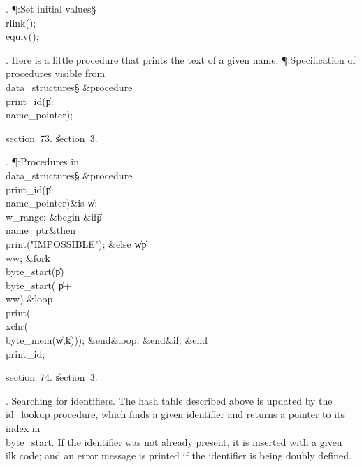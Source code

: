. \P\?:Set initial values\X\mathrel{+}\S\?\6
\\{rlink}\?\1(\?\2)\K{};\6
\\{equiv}\?\1(\?\2)\K{};\par
\fi

. Here is a little procedure that prints the text of a given name.
\Y\P\?\4:Specification of procedures visible from \\{data\_structures}\X\S%
\?\6
\&{procedure}\8\1\\{print\_id}\?(\1\?\|p\?:\?\\{name\_pointer}\?\2)\?\2;\par
\A section~73.
\U section~3\*.\fi

. \P\?:Procedures in \\{data\_structures}\X\S\?\6
\&{procedure}\8\1\\{print\_id}\?(\1\?\|p\?:\?\\{name\_pointer}\?\2)\?\2\8\&{is}%
\8\1\6
\|w\?:\?\\{w\_range};\6
\4\&{begin}\6
\&{if}\1\1\8\|p\?\G\?\\{name\_ptr}\2\8\&{then}\6
\\{print}\?\1(\?\.{"IMPOSSIBLE"}\?\2)\?;\6
\4\&{else}\6
\|w\?\K\?\|p\?\?\\{ww};\6
\1\&{for}\8\|k\?\in\?\\{byte\_start}\?\1(\?\|p\?\2)\to\?\\{byte\_start}\?\1(\?%
\|p\?+\?\\{ww}\?\2)-\8\&{loop}\6
\\{print}\?\1(\?\\{xchr}\?\1(\?\\{byte\_mem}\?\1(\?\|w\?,\?\|k\?\2)\2)\2)\?;%
\2\6
\&{end}\8\&{loop};\2\6
\&{end}\8\2\&{if}\1;\2\6
\&{end}\8\\{print\_id};\par
\A section~74.
\U section~3\*.\fi

.  Searching for identifiers.
The hash table described above is updated by the \\{id\_lookup} procedure,
which finds a given identifier and returns a pointer to its index in
\\{byte\_start}. If the identifier was not already present, it is inserted with
a given \\{ilk} code; and an error message is printed if the identifier is
being doubly defined.

